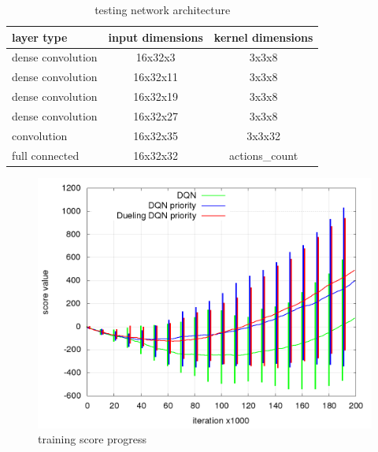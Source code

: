\documentclass[10pt,a4paper]{article}
\begin{document}
\begin{table}[]
\centering
\begin{tabular}{|l|c|c|}
\hline
\textbf{layer type}                       & \textbf{input dimensions} & \textbf{kernel dimensions} \\ \hline
\cellcolor[HTML]{CBCEFB}dense convolution & 16x32x3                   & 3x3x8                      \\ \hline
\cellcolor[HTML]{CBCEFB}dense convolution & 16x32x11                  & 3x3x8                      \\ \hline
\cellcolor[HTML]{CBCEFB}dense convolution & 16x32x19                  & 3x3x8                      \\ \hline
\cellcolor[HTML]{CBCEFB}dense convolution & 16x32x27                  & 3x3x8                      \\ \hline
\cellcolor[HTML]{67FD9A}convolution       & 16x32x35                  & 3x3x32                     \\ \hline
\cellcolor[HTML]{FD6864}full connected    & 16x32x32                  & actions\_count             \\ \hline
\end{tabular}
\caption{testing network architecture}
\label{tab:dqn_test_network_architecture}
\end{table}

\begin{figure}[!htb]
  \centering
  \includegraphics[scale=0.4]{../../rl_results/dqn_test/rl_progress_training.png}
  \caption{training score progress}
  \label{img:dqn_test_training_progress}
\end{figure}
\end{document}

